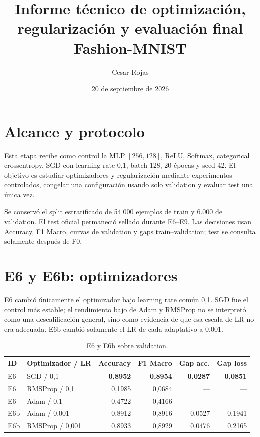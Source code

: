 \documentclass[10pt,a4paper]{article}
\title{Informe técnico de optimización, regularización y evaluación final\\Fashion-MNIST}
\author{Cesar Rojas}
\date{20 de septiembre de 2026}
\begin{document}
\maketitle

\section{Alcance y protocolo}

Esta etapa recibe como control la MLP $[256,128]$, ReLU, Softmax, categorical crossentropy, SGD con learning rate 0,1, batch 128, 20 épocas y seed 42. El objetivo es estudiar optimizadores y regularización mediante experimentos controlados, congelar una configuración usando solo validation y evaluar test una única vez.

Se conservó el split estratificado de 54.000 ejemplos de train y 6.000 de validation. El test oficial permaneció sellado durante E6--E9. Las decisiones usan Accuracy, F1 Macro, curvas de validation y gaps train--validation; test se consulta solamente después de F0.

\section{E6 y E6b: optimizadores}

E6 cambió únicamente el optimizador bajo learning rate común 0,1. SGD fue el control más estable; el rendimiento bajo de Adam y RMSProp no se interpretó como una descalificación general, sino como evidencia de que esa escala de LR no era adecuada. E6b cambió solamente el LR de cada adaptativo a 0,001.

\begin{table}[H]
\centering
\begin{tabular}{llrrrr}
\toprule
ID & Optimizador / LR & Accuracy & F1 Macro & Gap acc. & Gap loss \\
\midrule
E6 & SGD / 0,1 & \textbf{0,8952} & \textbf{0,8954} & \textbf{0,0287} & \textbf{0,0851} \\
E6 & RMSProp / 0,1 & 0,1985 & 0,0684 & --- & --- \\
E6 & Adam / 0,1 & 0,4722 & 0,4166 & --- & --- \\
E6b & Adam / 0,001 & 0,8912 & 0,8916 & 0,0527 & 0,1941 \\
E6b & RMSProp / 0,001 & 0,8933 & 0,8929 & 0,0476 & 0,2165 \\
\bottomrule
\end{tabular}
\caption{E6 y E6b sobre validation.}
\end{table}
\end{document}
